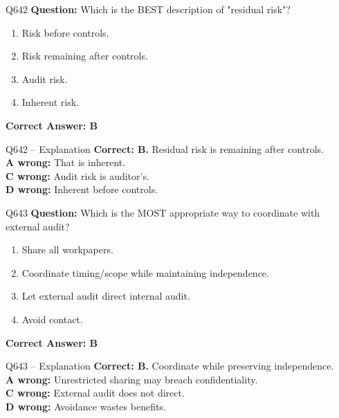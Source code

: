 \documentclass[aspectratio=169,10pt]{beamer}
\begin{document}
	\begin{frame}[t]{Q642}
		\small
		\textbf{Question:} Which is the BEST description of "residual risk"?
		\begin{enumerate}[label=\Alph*.,itemsep=1pt,topsep=2pt]
			\item Risk before controls.
			\item Risk remaining after controls.
			\item Audit risk.
			\item Inherent risk.
		\end{enumerate}
		\vspace{4pt}
		\textbf{Correct Answer: B}
	\end{frame}
	
	\begin{frame}[t]{Q642 -- Explanation}
		\small
		\textbf{Correct: B.} Residual risk is remaining after controls. \\[4pt]
		\textbf{A wrong:} That is inherent. \\[2pt]
		\textbf{C wrong:} Audit risk is auditor's. \\[2pt]
		\textbf{D wrong:} Inherent before controls.
	\end{frame}
	
	\begin{frame}[t]{Q643}
		\small
		\textbf{Question:} Which is the MOST appropriate way to coordinate with external audit?
		\begin{enumerate}[label=\Alph*.,itemsep=1pt,topsep=2pt]
			\item Share all workpapers.
			\item Coordinate timing/scope while maintaining independence.
			\item Let external audit direct internal audit.
			\item Avoid contact.
		\end{enumerate}
		\vspace{4pt}
		\textbf{Correct Answer: B}
	\end{frame}
	
	\begin{frame}[t]{Q643 -- Explanation}
		\small
		\textbf{Correct: B.} Coordinate while preserving independence. \\[4pt]
		\textbf{A wrong:} Unrestricted sharing may breach confidentiality. \\[2pt]
		\textbf{C wrong:} External audit does not direct. \\[2pt]
		\textbf{D wrong:} Avoidance wastes benefits.
	\end{frame}
	
\end{document}
